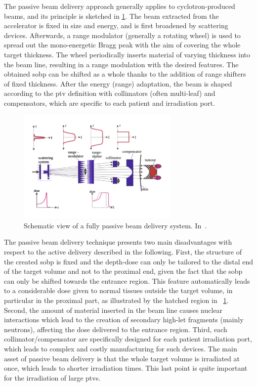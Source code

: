 The passive beam delivery approach  generally applies to cyclotron-produced beams, and its principle is sketched in \figurename\ref{chap1::fig::passiveDelivery}. The beam extracted from the accelerator is fixed in size and energy, and is first broadened by scattering devices. Afterwards, a range modulator (generally a rotating wheel) is used to spread out the mono-energetic Bragg peak with the aim of covering the whole target thickness. The wheel periodically inserts material of varying thickness into the beam line, resulting in a range modulation with the desired features. The obtained \gls{sobp} can be shifted as a whole thanks to the addition of range shifters of fixed thickness. After the energy (range) adaptation, the beam is shaped according to the \gls{ptv} definition with collimators (often multi-leaf) and compensators, which are specific to each patient and irradiation port.  

\begin{figure}[!htbp]
\centering
\includegraphics[width=0.7\textwidth]{03_GraphicFiles/chapter1_Introduction/passiveDelivery.pdf}
\caption{Schematic view of a fully passive beam delivery system. In~\cite{Schardt2010}.}
\label{chap1::fig::passiveDelivery}
\end{figure} 

The passive beam delivery technique presents two main disadvantages with respect to the active delivery described in the following. First, the structure of the created \gls{sobp} is fixed and the depth-dose can only be tailored to the distal end of the target volume and not to the proximal end, given the fact that the \gls{sobp} can only be shifted towards the entrance region. This feature automatically leads to a considerable dose given to normal tissues outside the target volume, in particular in the proximal part, as illustrated by the hatched region in \figurename~\ref{chap1::fig::passiveDelivery}. Second, the amount of material inserted in the beam line causes nuclear interactions which lead to the creation of secondary high-\gls{let} fragments (mainly neutrons), affecting the dose delivered to the entrance region. Third, each collimator/compensator are specifically designed for each patient irradiation port, which leads to complex and costly manufacturing for such devices.
The main asset of passive beam delivery is that the whole target volume is irradiated at once, which leads to shorter irradiation times. This last point is quite important for the irradiation of large \glspl{ptv}.

